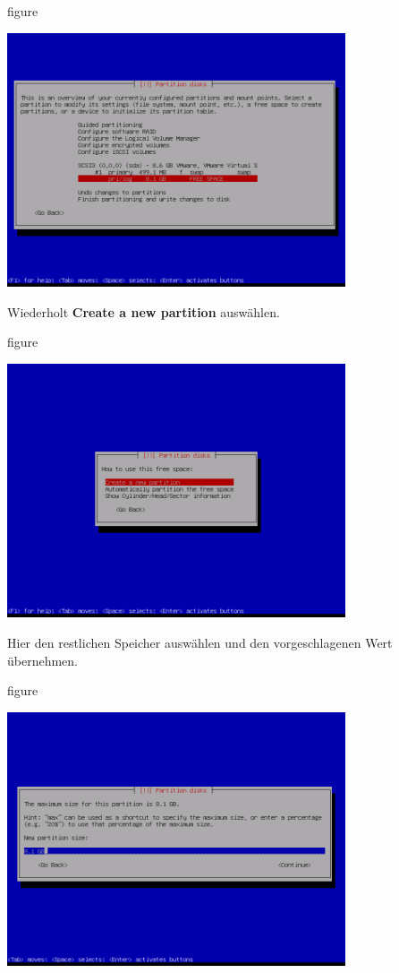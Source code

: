\begin{nofloat}{figure}
\begin{center}
\includegraphics[width=0.75\textwidth]{screenshots/20_ubuntu_install.png}
\end{center}
\end{nofloat}
\newpage
Wiederholt \textbf{Create a new partition} auswählen.

\begin{nofloat}{figure}
\begin{center}
\includegraphics[width=0.75\textwidth]{screenshots/21_ubuntu_install.png}
\end{center}
\end{nofloat}

Hier den restlichen Speicher auswählen und den vorgeschlagenen Wert übernehmen.

\begin{nofloat}{figure}
\begin{center}
\includegraphics[width=0.75\textwidth]{screenshots/22_ubuntu_install.png}
\end{center}
\end{nofloat}
\newpage

